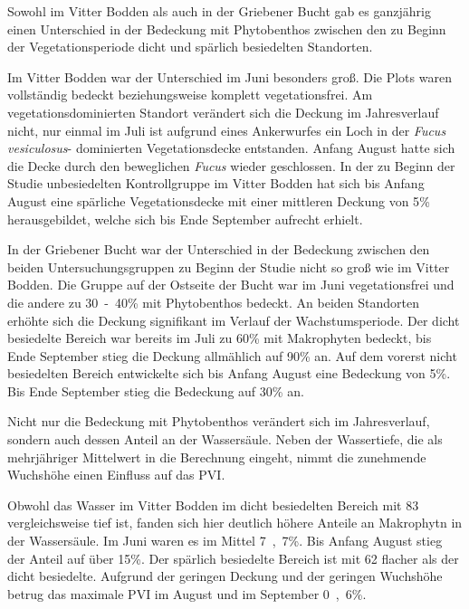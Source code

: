 Sowohl im Vitter Bodden als auch in der Griebener Bucht gab es ganzjährig einen Unterschied in der Bedeckung mit Phytobenthos zwischen den zu Beginn der Vegetationsperiode dicht und spärlich besiedelten Standorten.

Im Vitter Bodden war der Unterschied im Juni besonders groß. Die Plots waren vollständig bedeckt beziehungsweise komplett vegetationsfrei. Am vegetationsdominierten Standort verändert sich die Deckung im Jahresverlauf nicht, nur einmal im Juli ist aufgrund eines Ankerwurfes ein Loch in der \textit{Fucus vesiculosus}- dominierten Vegetationsdecke entstanden. Anfang August hatte sich die Decke durch den beweglichen \textit{Fucus} wieder geschlossen.
In der zu Beginn der Studie unbesiedelten Kontrollgruppe im Vitter Bodden hat sich bis Anfang August eine spärliche Vegetationsdecke mit einer mittleren Deckung von \unit{5}{\%} herausgebildet, welche sich bis Ende September aufrecht erhielt.

In der Griebener Bucht war der Unterschied in der Bedeckung zwischen den beiden Untersuchungsgruppen zu Beginn der Studie nicht so groß wie im Vitter Bodden. Die Gruppe auf der Ostseite der Bucht war im Juni vegetationsfrei und die andere zu \unit{30-40}{\%} mit Phytobenthos bedeckt. An beiden Standorten erhöhte sich die Deckung signifikant im Verlauf der Wachstumsperiode. Der dicht besiedelte Bereich war bereits im Juli zu \unit{60}{\%} mit Makrophyten bedeckt, bis Ende September stieg die Deckung allmählich auf \unit{90}{\%} an. Auf dem vorerst nicht besiedelten Bereich entwickelte sich bis Anfang August eine Bedeckung von \unit{5}{\%}. Bis Ende September stieg die Bedeckung auf \unit{30}{\%} an.

Nicht nur die Bedeckung mit Phytobenthos verändert sich im Jahresverlauf, sondern auch dessen Anteil an der Wassersäule. Neben der Wassertiefe, die als mehrjähriger Mittelwert in die Berechnung eingeht, nimmt die zunehmende Wuchshöhe einen Einfluss auf das PVI.

Obwohl das Wasser im Vitter Bodden im dicht besiedelten Bereich mit \unit{83}{\centi\metre} vergleichsweise tief ist, fanden sich hier deutlich höhere Anteile an Makrophytn in der Wassersäule. Im Juni waren es im Mittel \unit{7,7}{\%}. Bis Anfang August stieg der Anteil auf über \unit{15}{\%}. Der spärlich besiedelte Bereich ist mit \unit{62}{\centi\metre} flacher als der dicht besiedelte. Aufgrund der geringen Deckung und der geringen Wuchshöhe betrug das maximale PVI im August und im September \unit{0,6}{\%}. 

